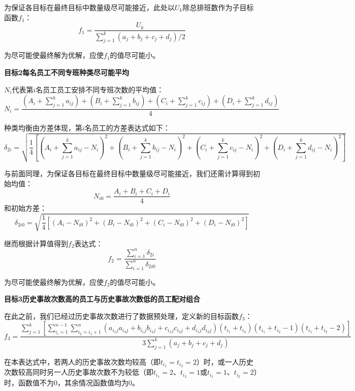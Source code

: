 \documentclass{article}
\begin{document}
	为保证各目标在最终目标中数量级尽可能接近，此处以$U_{k}$除总排班数作为子目标函数$f_{1}$：
	\begin{equation}
		f_1=\frac{U_k}{\sum_{j=1}^{k}(a_j+b_j+c_j+d_j)/2}
	\end{equation}
	
	为尽可能使最终解为优解，应使$f_1$的值尽可能小。
	
	\textbf{目标2\quad 每名员工不同专班种类尽可能平均}
	
	$N_i$代表第$i$名员工员工安排不同专班次数的平均值：
	\begin{equation}
		N_i=\frac{(A_i+\sum_{j=1}^ka_{ij})+(B_i+\sum_{j=1}^kb_{ij})+(C_i+\sum_{j=1}^kc_{ij})+(D_i+\sum_{j=1}^kd_{ij})}{4}
	\end{equation}
	
	种类均衡由方差体现，第$i$名员工的方差表达式如下：
	\begin{equation}
		\delta_{2i}=\sqrt{\frac{1}{4}[(A_i+\sum_{j=1}^ka_{ij}-N_i)^2+(B_i+\sum_{j=1}^kb_{ij}-N_i)^2+(C_i+\sum_{j=1}^kc_{ij}-N_i)^2+(D_i+\sum_{j=1}^kd_{ij}-N_i)^2]}
	\end{equation}
	
	与前面同理，为保证各目标在最终目标中数量级尽可能接近，我们还需计算得到初始均值：
	\begin{equation}
		N_{i0}=\frac{A_i+B_i+C_i+D_i}{4}
	\end{equation}
	和初始方差：
	\begin{equation}
		\delta_{2i0}=\sqrt{\frac{1}{4}[(A_i-N_{i0})^2+(B_i-N_{i0})^2+(C_i-N_{i0})^2+(D_i-N_{i0})^2]}
	\end{equation}
	
	继而根据计算值得到$f_2$表达式：
	\begin{equation}
		f_2=\frac{\sum_{i=1}^{n}\delta_{2i}}{\sum_{i=1}^{n}\delta_{2i0}}
	\end{equation}
	
	为尽可能使最终解为优解，应使$f_2$的值尽可能小。
	
	\textbf{目标3\quad 历史事故次数高的员工与历史事故次数低的员工配对组合}
	
	在此之前，我们已经过历史事故次数进行了数据预处理，定义新的目标函数$f_3$：
	\begin{equation}
		f_3=\frac{\sum_{j=1}^{k}[\sum_{i_i=1}^{n-1}\sum_{i_2=i_1+1}^{n}(a_{i_1j}a_{i_2j}+b_{i_1j}b_{i_2j}+c_{i_1j}c_{i_2j}+d_{i_1j}d_{i_2j})(t_{i_1}+t_{i_2})(t_{i_1}+t_{i_2}-1)(t_{i_1}+t_{i_2}-2)]}{3\sum_{j=1}^{k}(a_j+b_j+c_j+d_j)}
	\end{equation}
	
	在本表达式中，若两人的历史事故次数均较高（即$t_{i_1}=t_{i_2}=2$）时，或一人历史次数较高同时另一人历史事故次数不为较低（即$t_{i_1}=2$、$t_{i_2}=1$或$t_{i_1}=1$、$t_{i_2}=2$）时，函数值不为$0$，其余情况函数值均为$0$。
	
\end{document}
